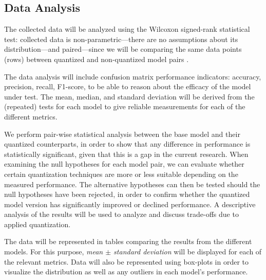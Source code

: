\documentclass[conference]{IEEEtran}
\begin{document}
\subsection{Data Analysis}


The collected data will be analyzed using the Wilcoxon signed-rank statistical
test: collected data is non-parametric---there are no assumptions about its
distribution---and paired---since we will be comparing the same data points
(rows) between quantized and non-quantized model pairs
\cite{wohlin2012experimentation}. 

The data analysis will include confusion matrix performance indicators:
accuracy, precision, recall, F1-score, to be able to reason about the efficacy
of the model under test. The mean, median, and standard deviation will be
derived from the (repeated) tests for each model to give reliable measurements for
each of the different metrics. 

We perform pair-wise statistical analysis between the base model and their quantized counterparts, in order to show that any difference in performance is statistically significant, given that this is a gap in the current research. When examining the null hypotheses for each model pair, we can evaluate whether certain quantization techniques are more or less suitable depending on the measured performance. The alternative hypotheses can then be tested should the null hypotheses have been rejected, in order to confirm whether the quantized model version has significantly improved or declined performance. A descriptive analysis of the results will be used to analyze and discuss trade-offs due to applied quantization. 

The data will be represented in tables comparing
the results from the different models. For this purpose, \textit{mean $\pm$ standard
deviation} will be displayed for each of the relevant metrics. Data will also be
represented using box-plots in order to visualize the distribution as well as
any outliers in each model's performance. 
\end{document}
